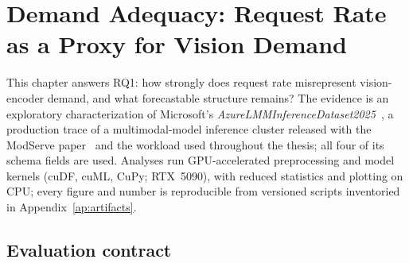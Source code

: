 \chapter{Demand Adequacy: Request Rate as a Proxy for Vision Demand}
\label{cap:trace-eda}

This chapter answers RQ1: how strongly does request rate misrepresent
vision-encoder demand, and what forecastable structure remains? The evidence is
an exploratory characterization of Microsoft's
\textit{AzureLMMInferenceDataset2025}~\cite{AzureLMM2025}, a production trace of
a multimodal-model inference cluster released with the ModServe
paper~\cite{Qiu2025ModServe} and the workload used throughout the thesis; all
four of its schema fields are used. Analyses run GPU-accelerated preprocessing
and model kernels (cuDF, cuML, CuPy; RTX~5090), with reduced statistics and
plotting on CPU; every figure and number is reproducible from versioned scripts
inventoried in Appendix~\ref{ap:artifacts}.

\section{Evaluation contract}
\label{sec:eda-contract}
\label{sec:eda-globals}

